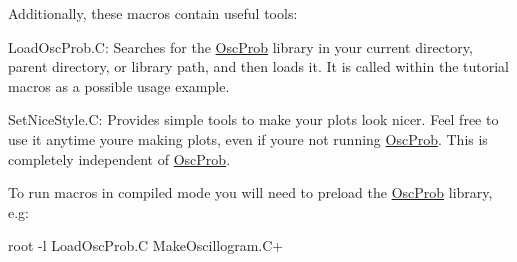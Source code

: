 Additionally, these macros contain useful tools\+:
\begin{DoxyItemize}
\item {\ttfamily Load\+Osc\+Prob.\+C}\+: Searches for the \hyperlink{namespaceOscProb}{Osc\+Prob} library in your current directory, parent directory, or library path, and then loads it. It is called within the tutorial macros as a possible usage example.
\item {\ttfamily Set\+Nice\+Style.\+C}\+: Provides simple tools to make your plots look nicer. Feel free to use it anytime you\textquotesingle{}re making plots, even if you\textquotesingle{}re not running \hyperlink{namespaceOscProb}{Osc\+Prob}. This is completely independent of \hyperlink{namespaceOscProb}{Osc\+Prob}.
\end{DoxyItemize}

To run macros in compiled mode you will need to preload the \hyperlink{namespaceOscProb}{Osc\+Prob} library, e.\+g\+:


\begin{DoxyCode}
root -l LoadOscProb.C MakeOscillogram.C+
\end{DoxyCode}
 